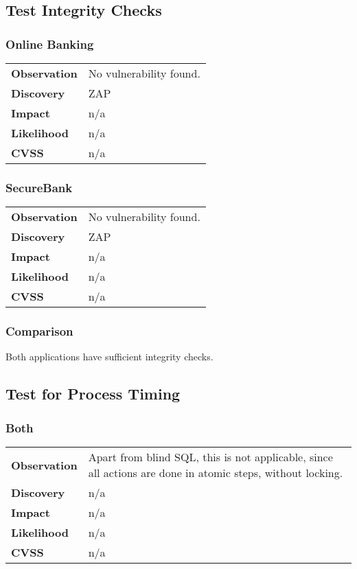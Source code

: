 \clearpage


\subsection{Test Integrity Checks}
\subsubsection*{Online Banking}
\begin{tabular}{l|p{10cm}}

\textbf{Observation} & No vulnerability found. \\
\textbf{Discovery} & ZAP \\
\textbf{Impact} & n/a \\
\textbf{Likelihood} & n/a \\
\textbf{CVSS} & n/a \\
\end{tabular}

\subsubsection*{SecureBank}
\begin{tabular}{l|p{10cm}}

\textbf{Observation} & No vulnerability found. \\
\textbf{Discovery} & ZAP \\
\textbf{Impact} & n/a \\
\textbf{Likelihood} & n/a \\
\textbf{CVSS} & n/a \\
\end{tabular}

\subsubsection*{Comparison}
Both applications have sufficient integrity checks.

\clearpage


\subsection{Test for Process Timing}
\subsubsection*{Both}
\begin{tabular}{l|p{10cm}}

\textbf{Observation} & Apart from blind SQL, this is not applicable, since all actions are done in atomic steps, without locking. \\
\textbf{Discovery} & n/a \\
\textbf{Impact} & n/a \\
\textbf{Likelihood} & n/a \\
\textbf{CVSS} & n/a \\
\end{tabular}

